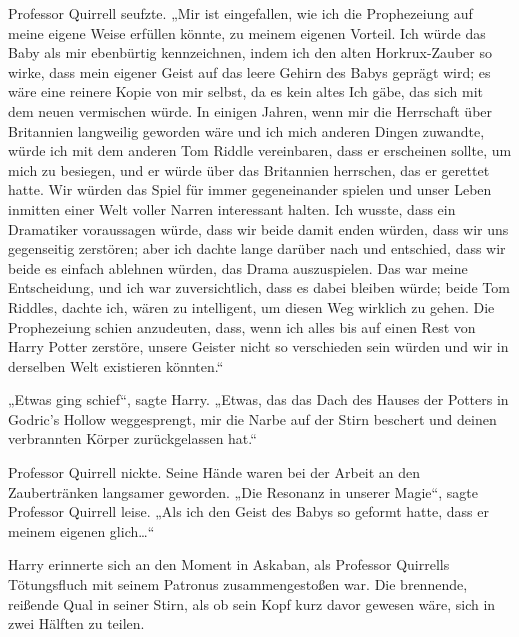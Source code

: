 Professor Quirrell seufzte.
„Mir ist eingefallen, wie ich die Prophezeiung auf meine eigene Weise erfüllen könnte, zu meinem eigenen Vorteil. Ich würde das Baby als mir ebenbürtig kennzeichnen, indem ich den alten Horkrux-Zauber so wirke, dass mein eigener Geist auf das leere Gehirn des Babys geprägt wird; es wäre eine reinere Kopie von mir selbst, da es kein altes Ich gäbe, das sich mit dem neuen vermischen würde. In einigen Jahren, wenn mir die Herrschaft über Britannien langweilig geworden wäre und ich mich anderen Dingen zuwandte, würde ich mit dem anderen Tom Riddle vereinbaren, dass er erscheinen sollte, um mich zu besiegen, und er würde über das Britannien herrschen, das er gerettet hatte. Wir würden das Spiel für immer gegeneinander spielen und unser Leben inmitten einer Welt voller Narren interessant halten. Ich wusste, dass ein Dramatiker voraussagen würde, dass wir beide damit enden würden, dass wir uns gegenseitig zerstören; aber ich dachte lange darüber nach und entschied, dass wir beide es einfach ablehnen würden, das Drama auszuspielen. Das war meine Entscheidung, und ich war zuversichtlich, dass es dabei bleiben würde; beide Tom Riddles, dachte ich, wären zu intelligent, um diesen Weg wirklich zu gehen. Die Prophezeiung schien anzudeuten, dass, wenn ich alles bis auf einen Rest von Harry Potter zerstöre, unsere Geister nicht so verschieden sein würden und wir in derselben Welt existieren könnten.“

„Etwas ging schief“, sagte Harry. „Etwas, das das Dach des Hauses der Potters in Godric’s Hollow weggesprengt, mir die Narbe auf der Stirn beschert und deinen verbrannten Körper zurückgelassen hat.“

Professor Quirrell nickte. Seine Hände waren bei der Arbeit an den Zaubertränken langsamer geworden.
„Die Resonanz in unserer Magie“, sagte Professor Quirrell leise.
„Als ich den Geist des Babys so geformt hatte, dass er meinem eigenen glich…“

Harry erinnerte sich an den Moment in Askaban, als Professor Quirrells Tötungsfluch mit seinem Patronus zusammengestoßen war. Die brennende, reißende Qual in seiner Stirn, als ob sein Kopf kurz davor gewesen wäre, sich in zwei Hälften zu teilen.


